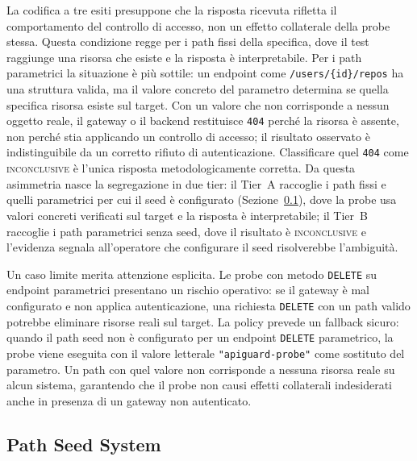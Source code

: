 La codifica a tre esiti presuppone che la risposta ricevuta rifletta il comportamento del controllo di accesso, non un effetto collaterale della probe stessa. Questa condizione regge per i path fissi della specifica, dove il test raggiunge una risorsa che esiste e la risposta è interpretabile. Per i path parametrici la situazione è più sottile: un endpoint come \texttt{/users/\{id\}/repos} ha una struttura valida, ma il valore concreto del parametro determina se quella specifica risorsa esiste sul target. Con un valore che non corrisponde a nessun oggetto reale, il gateway o il backend restituisce \texttt{404} perché la risorsa è assente, non perché stia applicando un controllo di accesso; il risultato osservato è indistinguibile da un corretto rifiuto di autenticazione. Classificare quel \texttt{404} come \textsc{inconclusive} è l'unica risposta metodologicamente corretta. Da questa asimmetria nasce la segregazione in due tier: il Tier~A raccoglie i path fissi e quelli parametrici per cui il seed è configurato (Sezione~\ref{subsec:path-seed}), dove la probe usa valori concreti verificati sul target e la risposta è interpretabile; il Tier~B raccoglie i path parametrici senza seed, dove il risultato è \textsc{inconclusive} e l'evidenza segnala all'operatore che configurare il seed risolverebbe l'ambiguità.

Un caso limite merita attenzione esplicita. Le probe con metodo \texttt{DELETE} su endpoint parametrici presentano un rischio operativo: se il gateway è mal configurato e non applica autenticazione, una richiesta \texttt{DELETE} con un path valido potrebbe eliminare risorse reali sul target. La policy prevede un fallback sicuro: quando il path seed non è configurato per un endpoint \texttt{DELETE} parametrico, la probe viene eseguita con il valore letterale \texttt{"apiguard-probe"} come sostituto del parametro. Un path con quel valore non corrisponde a nessuna risorsa reale su alcun sistema, garantendo che il probe non causi effetti collaterali indesiderati anche in presenza di un gateway non autenticato.


\subsection{Path Seed System}\label{subsec:path-seed}

